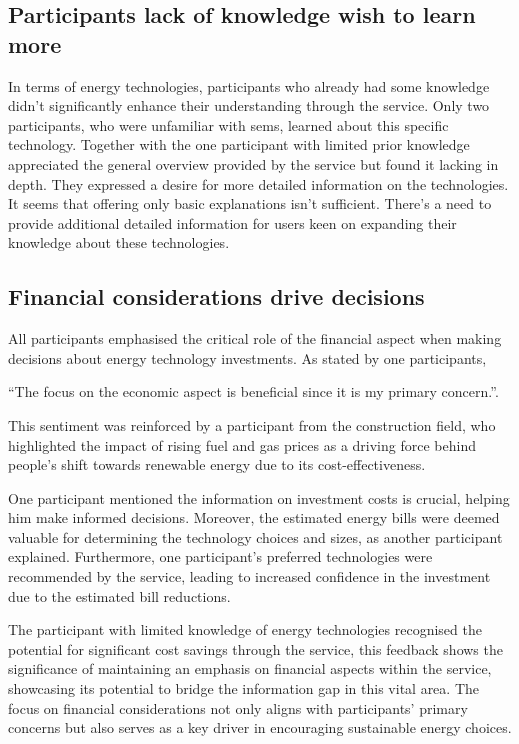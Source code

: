 \subsection{Participants lack of knowledge wish to learn more}

In terms of energy technologies, participants who already had some knowledge didn't significantly enhance their understanding through the service. 
Only two participants, who were unfamiliar with \gls{sems}, learned about this specific technology. 
Together with the one participant with limited prior knowledge appreciated the general overview provided by the service but found it lacking in depth. 
They expressed a desire for more detailed information on the technologies. 
It seems that offering only basic explanations isn't sufficient. 
There's a need to provide additional detailed information for users keen on expanding their knowledge about these technologies.


\subsection{Financial considerations drive decisions}

All participants emphasised the critical role of the financial aspect when making decisions about energy technology investments. 
As stated by one participants, 
\begin{displayquote}
  ``The focus on the economic aspect is beneficial since it is my primary concern.''. 
\end{displayquote}
This sentiment was reinforced by a participant from the construction field, who highlighted the impact of rising fuel and gas prices as a driving force behind people's shift towards renewable energy due to its cost-effectiveness.

One participant mentioned the information on investment costs is crucial, helping him make informed decisions. 
Moreover, the estimated energy bills were deemed valuable for determining the technology choices and sizes, as another participant explained.
Furthermore, one participant's preferred technologies were recommended by the service, leading to increased confidence in the investment due to the estimated bill reductions.

The participant with limited knowledge of energy technologies recognised the potential for significant cost savings through the service, 
this feedback shows the significance of maintaining an emphasis on financial aspects within the service, 
showcasing its potential to bridge the information gap in this vital area. 
The focus on financial considerations not only aligns with participants' primary concerns but also serves as a key driver in encouraging sustainable energy choices.



